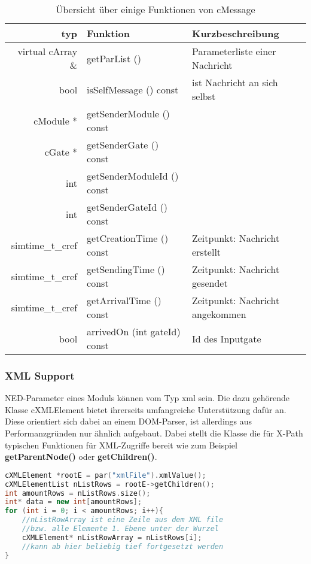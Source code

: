 \begin{table}[!ht]
  \centering
  \caption{Übersicht über einige Funktionen von cMessage}
\begin{tabularx}{\textwidth}{rll}
	\toprule
	typ & Funktion & Kurzbeschreibung\\
	\midrule	
	virtual cArray \& & getParList () & Parameterliste einer Nachricht\\
	bool 	& isSelfMessage () const & ist Nachricht an sich selbst\\
	cModule * 	& getSenderModule () const &  \\
	cGate * 	& getSenderGate () const  & \\
	int &	getSenderModuleId () const & \\
	int &	getSenderGateId () const & \\
	simtime\_t\_cref 	& getCreationTime () const & Zeitpunkt: Nachricht erstellt\\
	simtime\_t\_cref 	& getSendingTime () const & Zeitpunkt: Nachricht gesendet\\
	simtime\_t\_cref 	& getArrivalTime () const  & Zeitpunkt: Nachricht angekommen\\
	bool &	arrivedOn (int gateId) const & Id des Inputgate\\
	\bottomrule
\end{tabularx}
\end{table}

\subsubsection{XML Support}

NED-Parameter eines Moduls können vom Typ xml sein. Die dazu gehörende Klasse cXMLElement bietet ihrerseits umfangreiche Unterstützung dafür an. Diese orientiert sich dabei an einem DOM-Parser, ist allerdings aus Performanzgründen nur ähnlich aufgebaut. Dabei stellt die Klasse die für X-Path typischen Funktionen für XML-Zugriffe bereit wie zum Beispiel \textbf{getParentNode()} oder \textbf{getChildren()}.

\begin{minipage}{\textwidth}
\begin{lstlisting}[language=C++,caption={Beispiel einlesen von XML},label=lst:xml]
cXMLElement *rootE = par("xmlFile").xmlValue();
cXMLElementList nListRows = rootE->getChildren();
int amountRows = nListRows.size();
int* data = new int[amountRows];
for (int i = 0; i < amountRows; i++){
    //nListRowArray ist eine Zeile aus dem XML file 
    //bzw. alle Elemente 1. Ebene unter der Wurzel
    cXMLElement* nListRowArray = nListRows[i];
    //kann ab hier beliebig tief fortgesetzt werden
}
\end{lstlisting}
\end{minipage}


